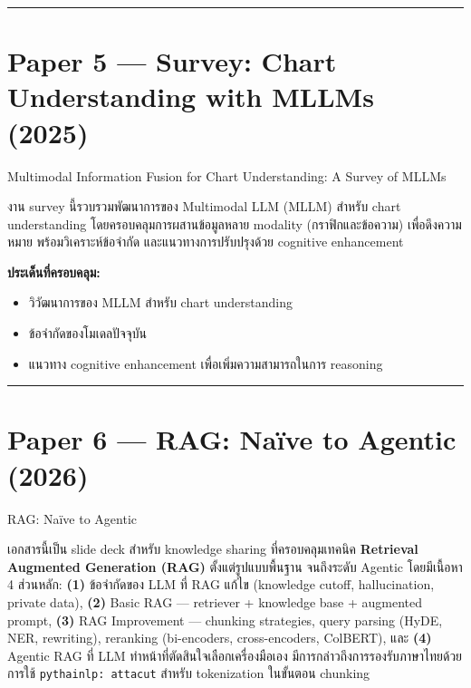 \documentclass[11pt,a4paper]{article}
\begin{document}
\vspace{12pt}
\noindent\rule{\textwidth}{0.4pt}

\section*{Paper 5 — Survey: Chart Understanding with MLLMs (2025)}

 Multimodal Information Fusion for Chart Understanding: A Survey of MLLMs\\

\vspace{8pt}
\setlength{\parindent}{2em}
งาน survey นี้รวบรวมพัฒนาการของ Multimodal LLM (MLLM) สำหรับ
chart understanding โดยครอบคลุมการผสานข้อมูลหลาย modality
(กราฟิกและข้อความ) เพื่อดึงความหมาย พร้อมวิเคราะห์ข้อจำกัด
และแนวทางการปรับปรุงด้วย cognitive enhancement

\vspace{6pt}
\noindent\textbf{ประเด็นที่ครอบคลุม:}
\begin{itemize}[nosep, leftmargin=2em]
  \item วิวัฒนาการของ MLLM สำหรับ chart understanding
  \item ข้อจำกัดของโมเดลปัจจุบัน
  \item แนวทาง cognitive enhancement เพื่อเพิ่มความสามารถในการ reasoning
\end{itemize}

\vspace{12pt}
\noindent\rule{\textwidth}{0.4pt}

\section*{Paper 6 — RAG: Naïve to Agentic (2026)}

 RAG: Naïve to Agentic\\

\vspace{8pt}
\setlength{\parindent}{2em}
เอกสารนี้เป็น slide deck สำหรับ knowledge sharing ที่ครอบคลุมเทคนิค
\textbf{Retrieval Augmented Generation (RAG)} ตั้งแต่รูปแบบพื้นฐาน
จนถึงระดับ Agentic โดยมีเนื้อหา 4 ส่วนหลัก:
\textbf{(1)} ข้อจำกัดของ LLM ที่ RAG แก้ไข (knowledge cutoff, hallucination, private data),
\textbf{(2)} Basic RAG — retriever + knowledge base + augmented prompt,
\textbf{(3)} RAG Improvement — chunking strategies, query parsing (HyDE, NER, rewriting), reranking (bi-encoders, cross-encoders, ColBERT),
และ \textbf{(4)} Agentic RAG ที่ LLM ทำหน้าที่ตัดสินใจเลือกเครื่องมือเอง
มีการกล่าวถึงการรองรับภาษาไทยด้วยการใช้ \texttt{pythainlp: attacut}
สำหรับ tokenization ในขั้นตอน chunking
\end{document}
